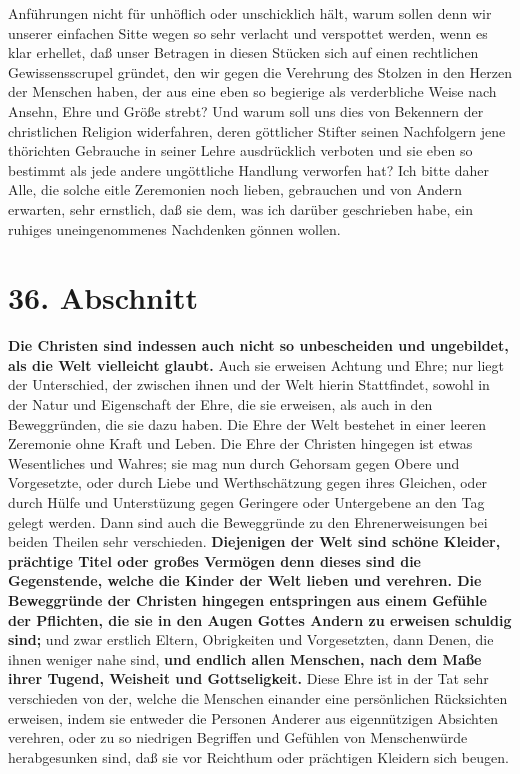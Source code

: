 Anführungen nicht für unhöflich oder unschicklich hält, warum sollen denn wir
unserer einfachen Sitte wegen so sehr verlacht und verspottet werden, wenn es
klar erhellet, daß unser Betragen in diesen Stücken sich auf einen rechtlichen
Gewissensscrupel gründet, den wir gegen die Verehrung des Stolzen in den Herzen
der Menschen haben, der aus eine eben so begierige als verderbliche Weise nach
Ansehn, Ehre und Größe strebt? Und warum soll uns dies von Bekennern der
christlichen Religion widerfahren, deren göttlicher Stifter seinen Nachfolgern
jene thörichten Gebrauche in seiner Lehre ausdrücklich verboten und sie eben so
bestimmt als jede andere ungöttliche Handlung verworfen hat? Ich bitte daher
Alle, die solche eitle Zeremonien noch lieben, gebrauchen und von Andern
erwarten, sehr ernstlich, daß sie dem, was ich darüber geschrieben habe, ein
ruhiges uneingenommenes  Nachdenken gönnen wollen.

\section{36. Abschnitt} \label{kap9_ab36}

\textbf{Die Christen sind indessen auch nicht so unbescheiden und ungebildet, als die
Welt vielleicht glaubt.} Auch sie erweisen Achtung und Ehre; nur liegt der
Unterschied, der zwischen ihnen und der Welt hierin Stattfindet, sowohl in der
Natur und Eigenschaft der Ehre, die sie erweisen, als auch in den Beweggründen,
die sie dazu haben. Die Ehre der Welt bestehet in einer leeren Zeremonie ohne
Kraft und Leben. Die Ehre der Christen hingegen ist etwas Wesentliches und
Wahres; sie mag nun durch Gehorsam gegen Obere und Vorgesetzte, oder durch Liebe
und Werthschätzung gegen ihres Gleichen, oder durch Hülfe und Unterstüzung gegen
Geringere oder Untergebene an den Tag gelegt werden. Dann sind auch die
Beweggründe zu den Ehrenerweisungen bei beiden Theilen sehr verschieden.
\textbf{Diejenigen der Welt sind schöne Kleider, prächtige Titel oder großes Vermögen
denn dieses sind die Gegenstende, welche die Kinder der Welt lieben und
verehren. Die Beweggründe der Christen hingegen entspringen aus einem Gefühle
der Pflichten, die sie in den Augen Gottes Andern zu erweisen schuldig sind;} und
zwar erstlich Eltern, Obrigkeiten und Vorgesetzten, dann Denen, die ihnen
weniger nahe sind, \textbf{und endlich allen Menschen, nach dem Maße ihrer Tugend,
Weisheit und Gottseligkeit.} Diese Ehre ist in der Tat sehr verschieden von der,
welche die Menschen einander eine persönlichen Rücksichten erweisen, indem sie
entweder die Personen Anderer aus eigennützigen Absichten verehren, oder zu so
niedrigen Begriffen und Gefühlen von Menschenwürde herabgesunken sind, daß sie
vor Reichthum oder prächtigen Kleidern sich beugen.

